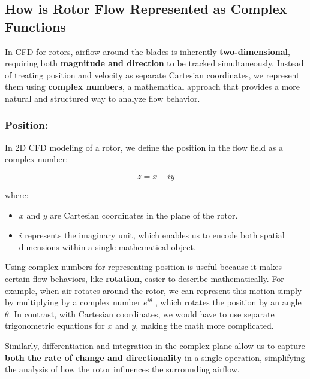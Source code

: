 \documentclass[a4paper,10.5pt]{article}
\begin{document}
\subsection{How is Rotor Flow Represented as Complex Functions}

In CFD for rotors, airflow around the blades is inherently \textbf{two-dimensional}, requiring both \textbf{magnitude and direction} to be tracked simultaneously. Instead of treating position and velocity as separate Cartesian coordinates, we represent them using \textbf{complex numbers}, a mathematical approach that provides a more natural and structured way to analyze flow behavior.

\subsubsection{Position:}

In 2D CFD modeling of a rotor, we define the position in the flow field as a complex number:

\begin{equation}
    z = x + iy
\end{equation}

where:

\begin{itemize}
    \item $x$ and $y$ are Cartesian coordinates in the plane of the rotor.
    \item $i$ represents the imaginary unit, which enables us to encode both spatial dimensions within a single mathematical object.
\end{itemize}

Using complex numbers for representing position is useful because it makes certain flow behaviors, like \textbf{rotation}, easier to describe mathematically. For example, when air rotates around the rotor, we can represent this motion simply by multiplying by a complex number $e^{i\theta}$ , which rotates the position by an angle $\theta$. In contrast, with Cartesian coordinates, we would have to use separate trigonometric equations for $x$ and $y$, making the math more complicated.

\vspace{0.2cm}

Similarly, differentiation and integration in the complex plane allow us to capture \textbf{both the rate of change and directionality} in a single operation, simplifying the analysis of how the rotor influences the surrounding airflow.
\end{document}
